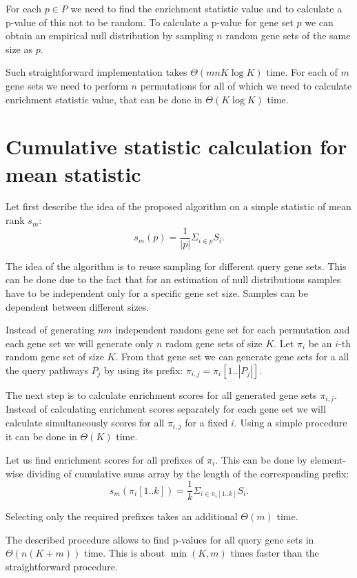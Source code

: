 \documentclass[runningheads,a4paper]{llncs}
\begin{document}
For each $p \in P$ we need to find the enrichment statistic value
and to calculate a p-value of this not to be random. 
To calculate a p-value for gene set $p$ we can obtain an empirical 
null distribution
by sampling $n$ random gene sets of the same size as $p$. 

Such straightforward implementation takes $\Theta(mnK \log K)$ time.
For each of $m$ gene sets we need to perform $n$ permutations for all
of which we need to calculate enrichment statistic value, that
can be done in $\Theta(K \log K)$ time.

\section{Cumulative statistic calculation for mean statistic}\label{section_mean}

Let first describe the idea of the proposed algorithm on a simple statistic
of mean rank $s_m$:
\[
    s_m(p) = \frac{1}{|p|} \Sigma_{i \in p} S_i.
\]

The idea of the algorithm is to reuse sampling for different query gene sets.
This can be done due to the fact that for an estimation of null distributions
samples have to be independent only for a specific gene set size.
Samples can be dependent between different sizes.

Instead of generating $nm$ independent random gene set for each
permutation and each gene set we will generate only $n$ radom
gene sets of size $K$. Let $\pi_i$ be an $i$-th random gene set of 
size $K$. From that gene set we can generate gene sets
for a all the query pathways $P_j$ by using its prefix: $\pi_{i,j}=
\pi_i[1..|P_j|]$.

The next step is to calculate enrichment scores for all generated
gene sets $\pi_{i,j}$. Instead of 
calculating enrichment scores separately for each gene set
we will calculate simultaneously scores for all $\pi_{i,j}$ for a fixed
$i$. Using a simple procedure it can be done in $\Theta(K)$ time.

Let us find enrichment scores for all prefixes of $\pi_i$. This
can be done by element-wise dividing of cumulative sums array
by the length of the corresponding prefix:
\[
    s_m(\pi_i[1..k]) = \frac{1}{k} \Sigma_{i \in \pi_i[1..k]} S_i.
\]

Selecting only the required prefixes takes an additional $\Theta(m)$ time. 

The described procedure allows to find p-values
for all query gene sets in $\Theta(n(K+m))$ time.
This is about $\min(K, m)$ times faster than the straightforward procedure.
\end{document}
